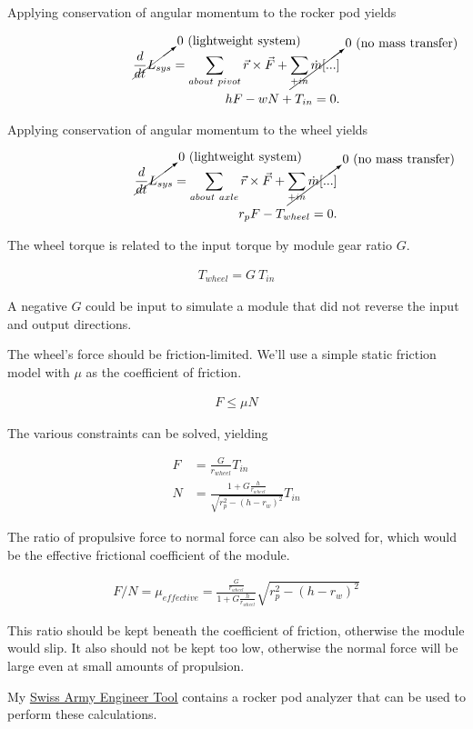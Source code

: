 \documentclass[10pt,letterpaper]{article}
\begin{document}
Applying conservation of angular momentum to the rocker pod yields

\begin{align}
	\cancelto{\mbox{0 (lightweight system)}}{\frac{d}{dt} L_{sys}} = \sum_{about\ pivot} \vec{r} \times \vec{F} + \cancelto{\mbox{0 (no mass transfer)}}{\sum_{+in} \dot{m} [...]} \nonumber \\
	h F - w N + T_{in} = 0 .
\end{align}

Applying conservation of angular momentum to the wheel yields

\begin{align}
	\cancelto{\mbox{0 (lightweight system)}}{\frac{d}{dt} L_{sys}} = \sum_{about\ axle} \vec{r} \times \vec{F} + \cancelto{\mbox{0 (no mass transfer)}}{\sum_{+in} \dot{m} [...]} \nonumber \\
	r_{p} F - T_{wheel} = 0 .
\end{align}

The wheel torque is related to the input torque by module gear ratio $G$.

\begin{align}
	T_{wheel} = G \ T_{in}
\end{align}

A negative $G$ could be input to simulate a module that did not reverse the input and output directions.

The wheel's force should be friction-limited. We'll use a simple static friction model with $\mu$ as the coefficient of friction.

\begin{align}
	F \leq \mu N	
\end{align}

The various constraints can be solved, yielding

\begin{align}
	F &= \frac{G}{r_{wheel}} T_{in} \\
	N &= \frac{1 + G \frac{h}{r_{wheel}}}{\sqrt{r_{p}^2 - (h - r_{w})^2}} T_{in}
\end{align}

The ratio of propulsive force to normal force can also be solved for, which would be the effective frictional coefficient of the module.

\begin{align}
	F/N = \mu_{effective} = \frac{\frac{G}{r_{wheel}}}{ 1 + G \frac{h}{r_{wheel}} } \sqrt{r_{p}^2 - (h - r_{w})^2}
\end{align}

This ratio should be kept beneath the coefficient of friction, otherwise the module would slip. It also should not be kept too low, otherwise the normal force will be large even at small amounts of propulsion.

My \href{https://thaddeus-maximus.github.io/swissarmyengineer/rockerpod}{\color{red}\underline{Swiss Army Engineer Tool}} contains a rocker pod analyzer that can be used to perform these calculations.
	
\end{document}
